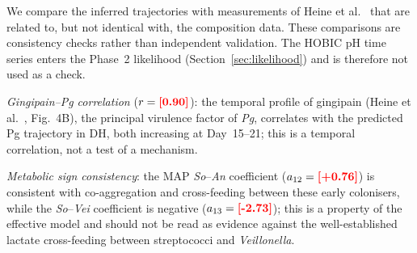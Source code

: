 \documentclass[pdflatex,sn-mathphys-num,lineno]{sn-jnl}
\newcommand{\TBD}[1]{\textcolor{red}{\textbf{[#1]}}}
\begin{document}
We compare the inferred trajectories with measurements of Heine et al.~\cite{heine2025influence} that are related to, but not identical with, the composition data.
These comparisons are consistency checks rather than independent validation.
The HOBIC pH time series enters the Phase~2 likelihood (Section~\ref{sec:likelihood}) and is therefore not used as a check.

\textit{Gingipain--\textit{Pg} correlation} ($r=\TBD{0.90}$):
the temporal profile of gingipain (Heine et al.~\cite{heine2025influence}, Fig.~4B), the principal virulence factor of \textit{Pg}, correlates with the predicted Pg trajectory in DH, both increasing at Day~15--21; this is a temporal correlation, not a test of a mechanism.

\textit{Metabolic sign consistency}:
the MAP \textit{So}--\textit{An} coefficient ($a_{12}=\TBD{+0.76}$) is consistent with co-aggregation and cross-feeding between these early colonisers, while the \textit{So}--\textit{Vei} coefficient is negative ($a_{13}=\TBD{-2.73}$); this is a property of the effective model and should not be read as evidence against the well-established lactate cross-feeding between streptococci and \textit{Veillonella}.
\end{document}
